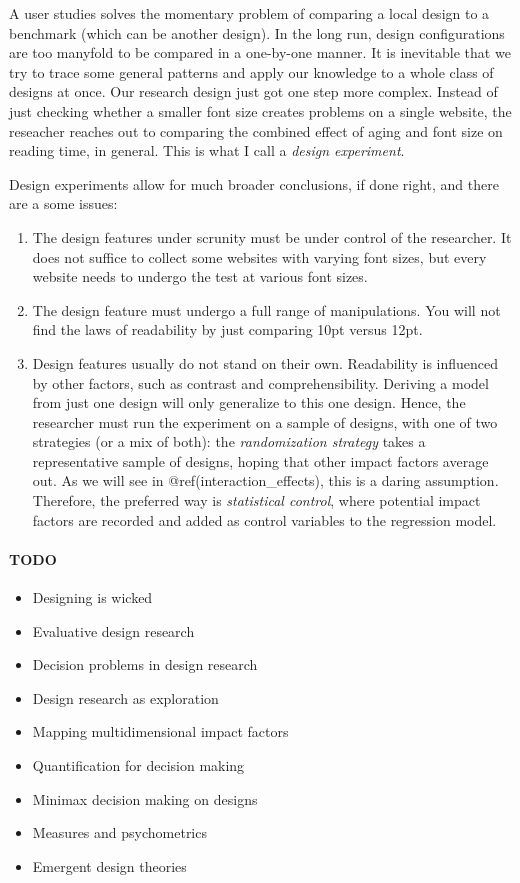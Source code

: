 \documentclass[]{svmono}
\providecommand{\tightlist}{%
  \setlength{\itemsep}{0pt}\setlength{\parskip}{0pt}}
\let\oldparagraph\paragraph
\renewcommand{\paragraph}[1]{\oldparagraph{#1}\mbox{}}
\theoremstyle{definition}
\theoremstyle{definition}
\theoremstyle{definition}
\theoremstyle{remark}
\begin{document}
A user studies solves the momentary problem of comparing a local design
to a benchmark (which can be another design). In the long run, design
configurations are too manyfold to be compared in a one-by-one manner.
It is inevitable that we try to trace some general patterns and apply
our knowledge to a whole class of designs at once. Our research design
just got one step more complex. Instead of just checking whether a
smaller font size creates problems on a single website, the reseacher
reaches out to comparing the combined effect of aging and font size on
reading time, in general. This is what I call a \emph{design
experiment}.

Design experiments allow for much broader conclusions, if done right,
and there are a some issues:

\begin{enumerate}
\def\labelenumi{\arabic{enumi}.}
\tightlist
\item
  The design features under scrunity must be under control of the
  researcher. It does not suffice to collect some websites with varying
  font sizes, but every website needs to undergo the test at various
  font sizes.
\item
  The design feature must undergo a full range of manipulations. You
  will not find the laws of readability by just comparing 10pt versus
  12pt.
\item
  Design features usually do not stand on their own. Readability is
  influenced by other factors, such as contrast and comprehensibility.
  Deriving a model from just one design will only generalize to this one
  design. Hence, the researcher must run the experiment on a sample of
  designs, with one of two strategies (or a mix of both): the
  \emph{randomization strategy} takes a representative sample of
  designs, hoping that other impact factors average out. As we will see
  in @ref(interaction\_effects), this is a daring assumption. Therefore,
  the preferred way is \emph{statistical control}, where potential
  impact factors are recorded and added as control variables to the
  regression model.
\end{enumerate}

\paragraph{TODO}\label{todo}

\begin{itemize}
\tightlist
\item
  Designing is wicked
\item
  Evaluative design research
\item
  Decision problems in design research
\item
  Design research as exploration
\item
  Mapping multidimensional impact factors
\item
  Quantification for decision making
\item
  Minimax decision making on designs
\item
  Measures and psychometrics
\item
  Emergent design theories
\end{itemize}
\end{document}
